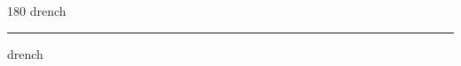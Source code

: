 
\begin{frame}
\begin{center}
\begin{turn}{180}
{\fontsize{2.5cm}{1em}\selectfont drench}
\end{turn}
\vspace{1em}\par  
\hrule
\vspace{1em}\par  
{\fontsize{2.5cm}{1em}\selectfont drench}
\end{center}
\end{frame}

